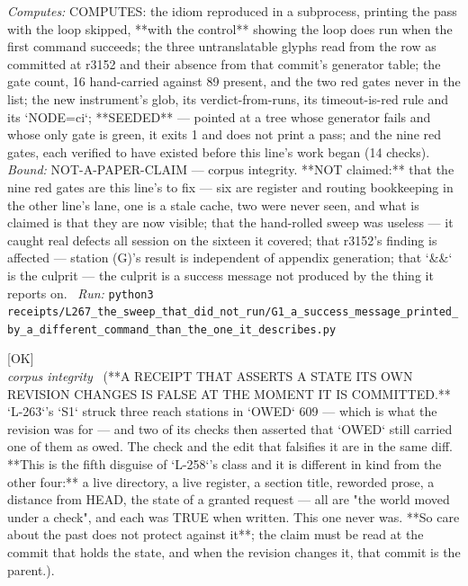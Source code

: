 \begin{description}
\emph{Computes:} COMPUTES: the idiom reproduced in a subprocess, printing the pass with the loop skipped, **with the control** showing the loop does run when the first command succeeds; the three untranslatable glyphs read from the row as committed at r3152 and their absence from that commit's generator table; the gate count, 16 hand-carried against 89 present, and the two red gates never in the list; the new instrument's glob, its verdict-from-runs, its timeout-is-red rule and its `NODE=ci`; **SEEDED** --- pointed at a tree whose generator fails and whose only gate is green, it exits 1 and does not print a pass; and the nine red gates, each verified to have existed before this line's work began (14 checks).
 \emph{Bound:} NOT-A-PAPER-CLAIM --- corpus integrity. **NOT claimed:** that the nine red gates are this line's to fix --- six are register and routing bookkeeping in the other line's lane, one is a stale cache, two were never seen, and what is claimed is that they are now visible; that the hand-rolled sweep was useless --- it caught real defects all session on the sixteen it covered; that r3152's finding is affected --- station (G)'s result is independent of appendix generation; that `\&\&` is the culprit --- the culprit is a success message not produced by the thing it reports on.
\ \emph{Run:} \texttt{python3 receipts/L267\_the\_sweep\_that\_did\_not\_run/G1\_a\_success\_message\_printed\_by\_a\_different\_command\_than\_the\_one\_it\_describes.py}
\item[\label{rcpt:O1_a_receipt_that_asserts_a_state_its_own_revision_changes_is_false_when_committed}\texttt{O1\_a\_receipt\_that\_asserts\_a\_state\_its\_own\_revision\_changes\_is\_false\_when\_committed}]\hfill\textsf{[OK]}\\
\textit{corpus integrity} \ (**A RECEIPT THAT ASSERTS A STATE ITS OWN REVISION CHANGES IS FALSE AT THE MOMENT IT IS COMMITTED.** `L-263`'s `S1` struck three reach stations in `OWED` 609 --- which is what the revision was for --- and two of its checks then asserted that `OWED` still carried one of them as owed. The check and the edit that falsifies it are in the same diff. **This is the fifth disguise of `L-258`'s class and it is different in kind from the other four:** a live directory, a live register, a section title, reworded prose, a distance from HEAD, the state of a granted request --- all are "the world moved under a check", and each was TRUE when written. This one never was. **So care about the past does not protect against it**; the claim must be read at the commit that holds the state, and when the revision changes it, that commit is the parent.). 

\end{description}
